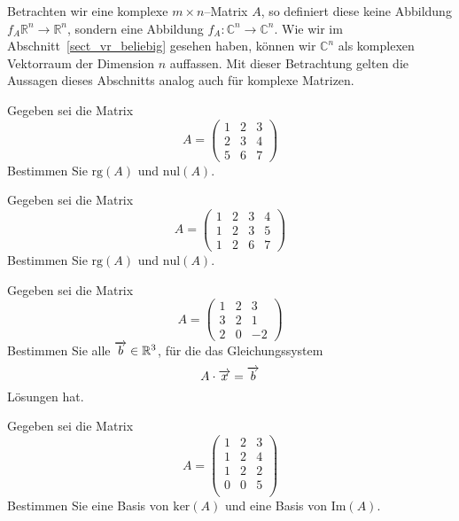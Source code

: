 \medbreak

\begin{notiz} Betrachten wir eine komplexe $m \times n$--Matrix $A$, so definiert diese keine Abbildung 
$f_A \mathbb R^n \longrightarrow \mathbb R^n$, sondern eine Abbildung 
$f_A: \mathbb C^n \longrightarrow \mathbb C^n$. Wie wir im Abschnitt~\ref{sect_vr_beliebig} gesehen haben, 
können wir $\mathbb C^n$ als komplexen Vektorraum der Dimension $n$ auffassen. Mit dieser Betrachtung 
gelten die Aussagen dieses Abschnitts analog auch für komplexe Matrizen.
\end{notiz}

\bigbreak

\begin{aufgabe} Gegeben sei die Matrix 
   	$$ A = \left( \begin{matrix} 1 & 2 & 3 \\ 2 & 3 & 4 \\ 5 & 6 & 7 \end{matrix} \right) $$
Bestimmen Sie $\textrm{rg}(A)$ und $\textrm{nul}(A)$.
\end{aufgabe} 

\begin{aufgabe} Gegeben sei die Matrix 
   	$$ A = \left( \begin{matrix} 1 & 2 & 3 & 4 \\ 1 & 2 & 3 & 5 \\ 1 & 2 & 6 & 7 \end{matrix} \right) $$
Bestimmen Sie $\textrm{rg}(A)$ und $\textrm{nul}(A)$.
\end{aufgabe} 


\begin{aufgabe} Gegeben sei die Matrix 
   	$$ A = \left( \begin{matrix} 1 & 2 & 3 \\ 3 & 2 & 1 \\ 2 & 0 & -2 \end{matrix} \right) $$
Bestimmen Sie alle $\overrightarrow{b} \in \mathbb R^3$, für die das Gleichungssystem 
  	$$  A  \cdot \overrightarrow{x} = \overrightarrow{b} $$
Lösungen hat.
\end{aufgabe} 

\begin{aufgabe} Gegeben sei die Matrix 
   	$$ A = \left( \begin{matrix} 1 & 2 & 3 \\ 1 & 2 & 4 \\ 1 & 2 & 2 \\ 0 & 0 & 5 \\
	\end{matrix} \right) $$
Bestimmen Sie eine Basis von $\textrm{ker}(A)$ und eine Basis von $\textrm{Im}(A)$.
\end{aufgabe} 

